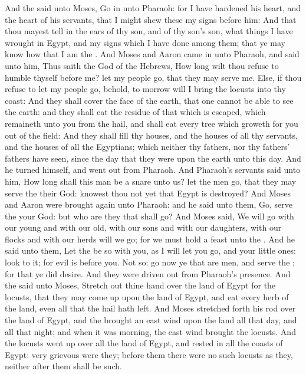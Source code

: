 \begin{biblechapter} %
 And the \LORD said unto Moses, Go in unto Pharaoh: for I have hardened his heart, and the heart of his servants, that I might shew these my signs before him:
\verse And that thou mayest tell in the ears of thy son, and of thy son's son, what things I have wrought in Egypt, and my signs which I have done among them; that ye may know how that I am the \LORD.
\verse And Moses and Aaron came in unto Pharaoh, and said unto him, Thus saith the \LORD God of the Hebrews, How long wilt thou refuse to humble thyself before me? let my people go, that they may serve me.
\verse Else, if thou refuse to let my people go, behold, to morrow will I bring the locusts into thy coast:
\verse And they shall cover the face of the earth, that one cannot be able to see the earth: and they shall eat the residue of that which is escaped, which remaineth unto you from the hail, and shall eat every tree which groweth for you out of the field:
\verse And they shall fill thy houses, and the houses of all thy servants, and the houses of all the Egyptians; which neither thy fathers, nor thy fathers' fathers have seen, since the day that they were upon the earth unto this day. And he turned himself, and went out from Pharaoh.
\verse And Pharaoh's servants said unto him, How long shall this man be a snare unto us? let the men go, that they may serve the \LORD their God: knowest thou not yet that Egypt is destroyed?
\verse And Moses and Aaron were brought again unto Pharaoh: and he said unto them, Go, serve the \LORD your God: but who are they that shall go?
\verse And Moses said, We will go with our young and with our old, with our sons and with our daughters, with our flocks and with our herds will we go; for we must hold a feast unto the \LORD.
\verse And he said unto them, Let the \LORD be so with you, as I will let you go, and your little ones: look to it; for evil is before you.
\verse Not so: go now ye that are men, and serve the \LORD; for that ye did desire. And they were driven out from Pharaoh's presence.
\verse And the \LORD said unto Moses, Stretch out thine hand over the land of Egypt for the locusts, that they may come up upon the land of Egypt, and eat every herb of the land, even all that the hail hath left.
\verse And Moses stretched forth his rod over the land of Egypt, and the \LORD brought an east wind upon the land all that day, and all that night; and when it was morning, the east wind brought the locusts.
\verse And the locusts went up over all the land of Egypt, and rested in all the coasts of Egypt: very grievous were they; before them there were no such locusts as they, neither after them shall be such.

\end{biblechapter}
